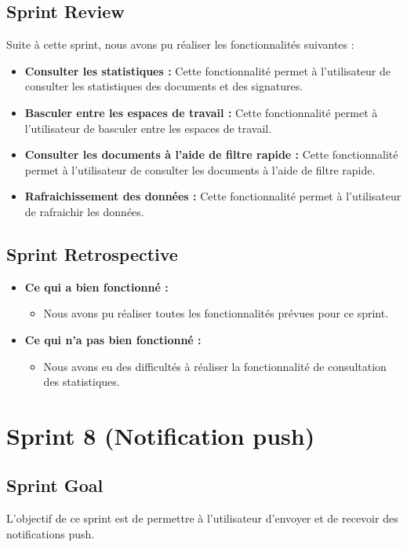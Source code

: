 \subsection{Sprint Review}
Suite à cette sprint, nous avons pu réaliser les fonctionnalités suivantes :
\begin{itemize}
  \item \textbf{Consulter les statistiques :} Cette fonctionnalité permet à l'utilisateur de consulter les statistiques des documents et des signatures.
  \item \textbf{Basculer entre les espaces de travail :} Cette fonctionnalité permet à l'utilisateur de basculer entre les espaces de travail.
  \item \textbf{Consulter les documents à l'aide de filtre rapide :} Cette fonctionnalité permet à l'utilisateur de consulter les documents à l'aide de filtre rapide.
  \item \textbf{Rafraichissement des données :} Cette fonctionnalité permet à l'utilisateur de rafraichir les données.
\end{itemize}

\subsection{Sprint Retrospective}

\begin{itemize}
  \item \textbf{Ce qui a bien fonctionné :}
  \begin{itemize}
    \item Nous avons pu réaliser toutes les fonctionnalités prévues pour ce sprint.
  \end{itemize}

    \item \textbf{Ce qui n'a pas bien fonctionné :}
    \begin{itemize}
      \item Nous avons eu des difficultés à réaliser la fonctionnalité de consultation des statistiques.
    \end{itemize}
      
\end{itemize}
\section{Sprint 8 (Notification push)}

\subsection{Sprint Goal}
L'objectif de ce sprint est de permettre à l'utilisateur d'envoyer et de recevoir des notifications push.

